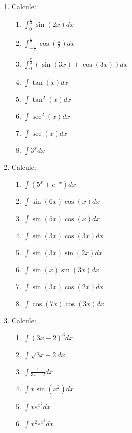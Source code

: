 \documentclass[oneside,a4paper,12pt]{article}
\begin{document}
\begin{enumerate}
	\item Calcule:
	\begin{multicols}{2}
		\begin{enumerate}
			\item $\displaystyle \int_{0}^{\frac{\pi}{3}}\sin(2x)dx$
			\item $\displaystyle \int_{-\frac{\pi}{2}}^{\frac{\pi}{2}}\cos(\frac{\pi}{2})dx$
			\item $\displaystyle \int_{0}^{\frac{\pi}{3}}(\sin(3x) + \cos(3x))dx$
			\item $\displaystyle \int \tan(x)dx$
			\item $\displaystyle \int \tan^2(x)dx$
			\item $\displaystyle \int \sec^2(x)dx$
			\item $\displaystyle \int \sec(x)dx$
			\item $\displaystyle \int 3^x dx$
		\end{enumerate}
	\end{multicols}

	\item Calcule:
	\begin{multicols}{2}
		\begin{enumerate}
			\item $\displaystyle \int (5^x + e^{-x})dx$
			\item $\displaystyle \int \sin(6x)\cos(x)dx$
			\item $\displaystyle \int \sin(5x)\cos(x)dx$
			\item $\displaystyle \int \sin(3x)\cos(3x)dx$
			\item $\displaystyle \int \sin(3x)\sin(2x)dx$
			\item $\displaystyle \int \sin(x)\sin(3x)dx$
			\item $\displaystyle \int \sin(3x)\cos(2x)dx$
			\item $\displaystyle \int \cos(7x)\cos(3x)dx$
		\end{enumerate}
	\end{multicols}

	\item Calcule:
	\begin{multicols}{2}
		\begin{enumerate}
			\item $\displaystyle \int (3x - 2)^3dx$
			\item $\displaystyle \int \sqrt{3x -2}dx$
			\item $\displaystyle \int \frac{1}{3x-2}dx$
			\item $\displaystyle \int x\sin(x^2)dx$
			\item $\displaystyle \int xe^{x^2}dx$
			\item $\displaystyle \int x^2 e^{x^3}dx$
		\end{enumerate}
	\end{multicols}
	

\end{enumerate}
\end{document}
